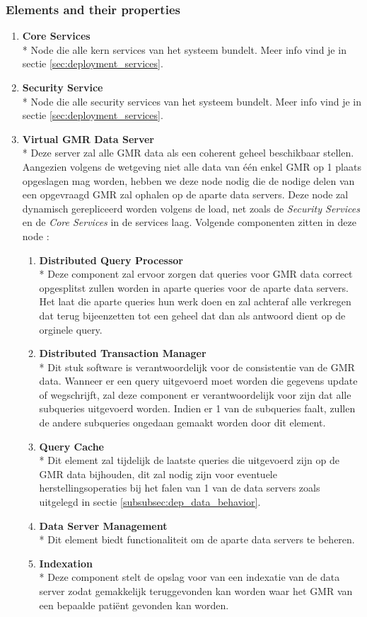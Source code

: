 \documentclass[a4paper,10pt]{article}
\begin{document}
\subsubsection{Elements and their properties}
\begin{enumerate}
 \item \textbf{Core Services}\\*
Node die alle kern services van het systeem bundelt. Meer info vind je in sectie \ref{sec:deployment_services}.
\item \textbf{Security Service}\\*
Node die alle security services van het systeem bundelt. Meer info vind je in sectie \ref{sec:deployment_services}.
\item \textbf{Virtual GMR Data Server}\\*
Deze server zal alle GMR data als een coherent geheel beschikbaar stellen. Aangezien volgens de wetgeving niet alle data van één enkel GMR op 1 plaats opgeslagen mag worden, hebben we deze node nodig die de nodige delen van een opgevraagd GMR zal ophalen op de aparte data servers. Deze node zal dynamisch gerepliceerd worden volgens de load, net zoals de \textit{Security Services} en de \textit{Core Services} in de services laag. Volgende componenten zitten in deze node : 
\begin{enumerate}
 \item \textbf{Distributed Query Processor}\\*
Deze component zal ervoor zorgen dat queries voor GMR data correct opgesplitst zullen worden in aparte queries voor de aparte data servers. Het laat die aparte queries hun werk doen en zal achteraf alle verkregen dat terug bijeenzetten tot een geheel dat dan als antwoord dient op de orginele query.
\item \textbf{Distributed Transaction Manager}\\*
Dit stuk software is verantwoordelijk voor de consistentie van de GMR data. Wanneer er een query uitgevoerd moet worden die gegevens update of wegschrijft, zal deze component er verantwoordelijk voor zijn dat alle subqueries uitgevoerd worden. Indien er 1 van de subqueries faalt, zullen de andere subqueries ongedaan gemaakt worden door dit element.
\item \textbf{Query Cache}\\*
Dit element zal tijdelijk de laatste queries die uitgevoerd zijn op de GMR data bijhouden, dit zal nodig zijn voor eventuele herstellingsoperaties bij het falen van 1 van de data servers zoals uitgelegd in sectie \ref{subsubsec:dep_data_behavior}.
\item \textbf{Data Server Management}\\*
Dit element biedt functionaliteit om de aparte data servers te beheren.
\item \textbf{Indexation}\\*
Deze component stelt de opslag voor van een indexatie van de data server zodat gemakkelijk teruggevonden kan worden waar het GMR van een bepaalde patiënt gevonden kan worden.
\end{enumerate}


\end{enumerate}
\end{document}
